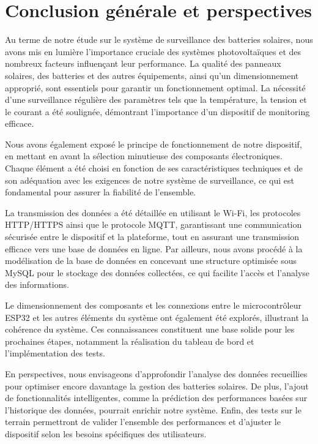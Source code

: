 \cleardoublepage
{} %
\chapter*{Conclusion générale et perspectives}

Au terme de notre étude sur le système de surveillance des batteries solaires, nous avons mis en lumière l'importance cruciale des systèmes photovoltaïques et des nombreux facteurs influençant leur performance. La qualité des panneaux solaires, des batteries et des autres équipements, ainsi qu'un dimensionnement approprié, sont essentiels pour garantir un fonctionnement optimal. La nécessité d'une surveillance régulière des paramètres tels que la température, la tension et le courant a été soulignée, démontrant l'importance d'un dispositif de monitoring efficace.

Nous avons également exposé le principe de fonctionnement de notre dispositif, en mettant en avant la sélection minutieuse des composants électroniques. Chaque élément a été choisi en fonction de ses caractéristiques techniques et de son adéquation avec les exigences de notre système de surveillance, ce qui est fondamental pour assurer la fiabilité de l'ensemble.

La transmission des données a été détaillée en utilisant le Wi-Fi, les protocoles HTTP/HTTPS ainsi que le protocole MQTT, garantissant une communication sécurisée entre le dispositif et la plateforme, tout en assurant une transmission efficace vers une base de données en ligne. Par ailleurs, nous avons procédé à la modélisation de la base de données en concevant une structure optimisée sous MySQL pour le stockage des données collectées, ce qui facilite l'accès et l'analyse des informations.

Le dimensionnement des composants et les connexions entre le microcontrôleur ESP32 et les autres éléments du système ont également été explorés, illustrant la cohérence du système. Ces connaissances constituent une base solide pour les prochaines étapes, notamment la réalisation du tableau de bord et l'implémentation des tests.

En perspectives, nous envisageons d'approfondir l'analyse des données recueillies pour optimiser encore davantage la gestion des batteries solaires. De plus, l'ajout de fonctionnalités intelligentes, comme la prédiction des performances basées sur l'historique des données, pourrait enrichir notre système. Enfin, des tests sur le terrain permettront de valider l'ensemble des performances et d'ajuster le dispositif selon les besoins spécifiques des utilisateurs.
